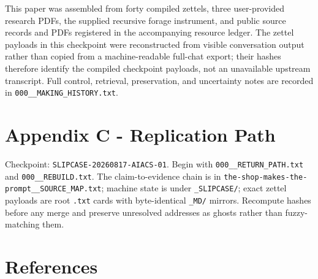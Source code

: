 \documentclass[
  11pt,
  letterpaper,
]{article}
\begin{document}
This paper was assembled from forty compiled zettels, three
user-provided research PDFs, the supplied recursive forage instrument,
and public source records and PDFs registered in the accompanying
resource ledger. The zettel payloads in this checkpoint were
reconstructed from visible conversation output rather than copied from a
machine-readable full-chat export; their hashes therefore identify the
compiled checkpoint payloads, not an unavailable upstream transcript.
Full control, retrieval, preservation, and uncertainty notes are
recorded in \texttt{000\_\_MAKING\_HISTORY.txt}.

\section{Appendix C - Replication
Path}\label{appendix-c---replication-path}

Checkpoint: \texttt{SLIPCASE-20260817-AIACS-01}. Begin with
\texttt{000\_\_RETURN\_PATH.txt} and \texttt{000\_\_REBUILD.txt}. The
claim-to-evidence chain is in
\texttt{the-shop-makes-the-prompt\_\_SOURCE\_MAP.txt}; machine state is
under \texttt{\_SLIPCASE/}; exact zettel payloads are root \texttt{.txt}
cards with byte-identical \texttt{\_MD/} mirrors. Recompute hashes
before any merge and preserve unresolved addresses as ghosts rather than
fuzzy-matching them.

\section*{References}\label{references}
\end{document}
